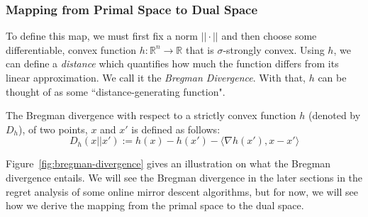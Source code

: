 \subsubsection{Mapping from Primal Space to Dual Space}
To define this map, we must first fix a norm $||\cdot||$ and then choose some differentiable, convex function $h: \mathbb{R}^n \to \mathbb{R}$ that is $\sigma$-strongly convex.
Using $h$, we can define a \textit{distance} which quantifies how much the function differs from its linear approximation. We call it the \textit{Bregman Divergence}. With that, $h$ can be thought of as some ``distance-generating function".
\begin{define}\label{defn:bregmann_div}
    The Bregman divergence with respect to a strictly convex function $h$ (denoted by $D_h$), of two points, $x$ and $x'$ is defined as follows:
    \begin{equation}
        D_h(x || x') := h(x) - h(x') - \langle\nabla h(x'),  x - x' \rangle
    \end{equation}
\end{define} 
Figure~\ref{fig:bregman-divergence} gives an illustration on what the Bregman divergence entails. We will see the Bregman divergence in the later sections in the regret analysis of some online mirror descent algorithms, but for now, we will see how we derive the mapping from the primal space to the dual space.

